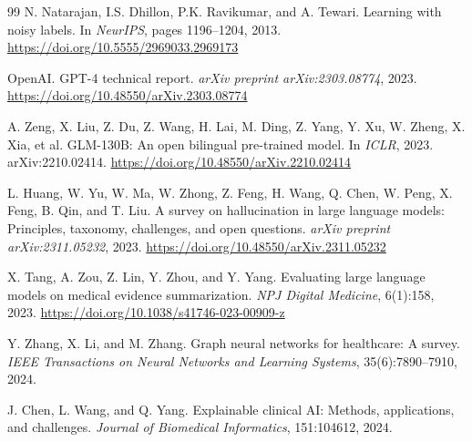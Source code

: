 \documentclass[11pt,onecolumn,a4paper]{article}
\begin{document}
\begin{thebibliography}{99}
N. Natarajan, I.S. Dhillon, P.K. Ravikumar, and A. Tewari.
\newblock Learning with noisy labels.
\newblock In \textit{NeurIPS}, pages 1196--1204, 2013.
\newblock \url{https://doi.org/10.5555/2969033.2969173}

OpenAI.
\newblock GPT-4 technical report.
\newblock \textit{arXiv preprint arXiv:2303.08774}, 2023.
\newblock \url{https://doi.org/10.48550/arXiv.2303.08774}

A. Zeng, X. Liu, Z. Du, Z. Wang, H. Lai, M. Ding, Z. Yang, Y. Xu, W. Zheng, X. Xia, et al.
\newblock GLM-130B: An open bilingual pre-trained model.
\newblock In \textit{ICLR}, 2023. arXiv:2210.02414.
\newblock \url{https://doi.org/10.48550/arXiv.2210.02414}

L. Huang, W. Yu, W. Ma, W. Zhong, Z. Feng, H. Wang, Q. Chen, W. Peng, X. Feng, B. Qin, and T. Liu.
\newblock A survey on hallucination in large language models: Principles, taxonomy, challenges, and open questions.
\newblock \textit{arXiv preprint arXiv:2311.05232}, 2023.
\newblock \url{https://doi.org/10.48550/arXiv.2311.05232}

X. Tang, A. Zou, Z. Lin, Y. Zhou, and Y. Yang.
\newblock Evaluating large language models on medical evidence summarization.
\newblock \textit{NPJ Digital Medicine}, 6(1):158, 2023.
\newblock \url{https://doi.org/10.1038/s41746-023-00909-z}

Y. Zhang, X. Li, and M. Zhang.
\newblock Graph neural networks for healthcare: A survey.
\newblock \textit{IEEE Transactions on Neural Networks and Learning Systems}, 35(6):7890--7910, 2024.

J. Chen, L. Wang, and Q. Yang.
\newblock Explainable clinical AI: Methods, applications, and challenges.
\newblock \textit{Journal of Biomedical Informatics}, 151:104612, 2024.

\end{thebibliography}
\end{document}
